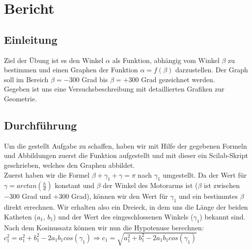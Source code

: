 \section{Bericht}

\subsection{Einleitung}
Ziel der Übung ist es den Winkel $\alpha$ als Funktion, abhängig vom Winkel $\beta$ zu bestimmen und einen Graphen der Funktion $\alpha = f(\beta)$ darzustellen. Der Graph soll im Bereich $\beta = -300$ Grad bis $\beta = +300$ Grad gezeichnet werden. \\
Gegeben ist uns eine Versuchsbeschreibung mit detaillierten Grafiken zur Geometrie.

\subsection{Durchführung}
Um die gestellt Aufgabe zu schaffen, haben wir mit Hilfe der gegebenen Formeln und Abbildungen zuerst die Funktion aufgestellt und mit dieser ein Scilab-Skript geschrieben, welches den Graphen abbildet.\\
Zuerst haben wir die Formel $\beta + \gamma_1 + \gamma = \pi$ nach $\gamma_1$ umgestellt. Da der Wert für $\gamma = arctan(\frac{h}{d})$ konstant und $\beta$ der Winkel des Motorarms ist ($\beta$ ist zwischen $-300$ Grad und $+300$ Grad), können wir den Wert für $\gamma_1$ und ein bestimmtes $\beta$ direkt errechnen. Wir erhalten also ein Dreieck, in dem uns die Länge der beiden Katheten ($a_1$, $b_1$) und der Wert des eingeschlossenen Winkels ($\gamma_1$) bekannt sind. \\
Nach dem Kosinussatz können wir nun die Hypotenuse berechnen:\\ $c_1^2 = a_1^2 + b_1^2 -2a_1b_1cos(\gamma_1) \Rightarrow c_1 = \sqrt{a_1^2 + b_1^2 -2a_1b_1cos(\gamma_1)}$

 
 
 
 
